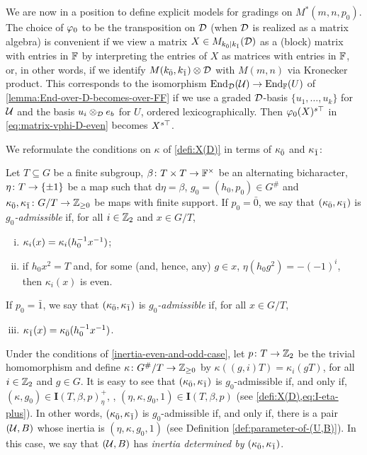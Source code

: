 We are now in a position to define explicit models for gradings on $M^*(m,n,p_0)$. 
The choice of $\varphi_0$ to be the transposition on $\mathcal{D}$ (when $\mathcal{D}$ is realized as a matrix algebra) is convenient if we view a matrix $X \in M_{k_{\bar{0}} \mid k_{\bar{1}}} (\mathcal{D})$ as a (block) matrix with entries in $\mathbb{F}$ by interpreting the entries of $X$ as matrices with entries in $\mathbb{F}$, or, in other words, if we identify $M(k_{\bar{0}}, k_{\bar{1}}) \otimes \mathcal{D}$ with $M(m,n)$ via Kronecker product. 
This corresponds to the isomorphism $\operatorname{End}_{\mathcal{D}}(\mathcal U) \to \operatorname{End}_{\mathbb{F}} (U)$ of \cref{lemma:End-over-D-becomes-over-FF} if we use a graded $\mathcal{D}$-basis $\{ u_1, \ldots, u_k \}$ for $\mathcal U$ and the basis $u_i \otimes_{\mathcal{D}} e_b$ for $U$, ordered lexicographically. 
Then $\varphi_0(X)^{s\top}$ in \cref{eq:matrix-vphi-D-even} becomes $X^{s\top}$. 

We reformulate the conditions on $\kappa$ of \cref{defi:X(D)} in terms of $\kappa_{\bar{0}}$ and $\kappa_{\bar{1}}$: 

\begin{defi}\label{inertia-even-and-odd-case}
    Let $T \subseteq G$ be a finite subgroup, $\beta\colon T\times T \to \mathbb{F}^\times$ be an alternating bicharacter, $\eta\colon T \to \{ \pm 1 \}$ be a map such that $\mathrm{d}\eta = \beta$, $g_0 = (h_0, p_0) \in G^\#$ and $\kappa_{\bar{0}}, \kappa_{\bar{1}} \colon G/T \to \mathbb{Z}_{\geq 0}$ be maps with finite support. 
    If $p_0 = \bar 0$, we say that $(\kappa_{\bar{0}}, \kappa_{\bar{1}})$ is \emph{$g_0$-admissible} if, for all $i\in \mathbb{Z}_2$ and $x\in G/T$, 
    \begin{enumerate}[(i)]
        \item $\kappa_i(x) = \kappa_i(h_0^{-1} x^{-1})$;
        \item if $h_0 x^2 = T$ and, for some (and, hence, any) $g\in x$, $\eta(h_0 g^2) = -(-1)^{i}$, then $\kappa_i(x)$ is even.
    \end{enumerate}
    If $p_0 = \bar 1$, we say that $(\kappa_{\bar{0}}, \kappa_{\bar{1}})$ is \emph{$g_0$-admissible} if, for all  $x\in G/T$, 
    \begin{enumerate}[(i)]
        \setcounter{enumi}{2}
        \item $\kappa_{\bar{1}} (x) = \kappa_{\bar{0}} (h_0^{-1} x^{-1})$. 
    \end{enumerate}
\end{defi}

Under the conditions of \cref{inertia-even-and-odd-case}, let $p\colon T \to \mathbb{Z}_2$ be the trivial homomorphism and define $\kappa\colon G^\#/T \to \mathbb{Z}_{\geq 0}$ by $\kappa ((g,i) T) = \kappa_i (gT)$, for all $i\in \mathbb{Z}_2$ and $g\in G$. 
It is easy to see that $(\kappa_{\bar{0}}, \kappa_{\bar{1}})$ is $g_0$-admissible if, and only if, $(\kappa, g_0) \in \mathbf{I}(T, \beta, p)^+_\eta$, \ie, $(\eta, \kappa, g_0, 1) \in \mathbf{I}(T, \beta, p)$ (see \cref{defi:X(D),eq:I-eta-plus}). 
In other words, $(\kappa_{\bar{0}}, \kappa_{\bar{1}})$ is $g_0$-admissible if, and only if, there is a pair $(\mathcal U, B)$ whose inertia is $(\eta, \kappa, g_0, 1)$ (see Definition \ref{def:parameter-of-(U,B)}). 
In this case, we say that $(\mathcal U, B)$ has \emph{inertia determined by} $(\kappa_{\bar{0}}, \kappa_{\bar{1}})$. 

